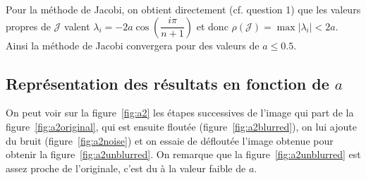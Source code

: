 Pour la méthode de Jacobi, on obtient directement (cf. question 1) que les valeurs propres de $\mathcal{J}$ valent
$\lambda _i = -2a \cos(\dfrac{i \pi}{n+1})$ et donc $\rho(\mathcal{J}) = \max |\lambda_i| < 2a$.
Ainsi la méthode de Jacobi convergera pour des valeurs de $a \leq 0.5$.

\subsection{Représentation des résultats en fonction de $a$}
On peut voir sur la figure~\ref{fig:a2} les étapes successives de l'image qui part
de la figure~\ref{fig:a2original}, qui est ensuite floutée (figure~\ref{fig:a2blurred}),
on lui ajoute du bruit (figure~\ref{fig:a2noise}) et on essaie de défloutée l'image obtenue pour
obtenir la figure~\ref{fig:a2unblurred}.
On remarque que la figure~\ref{fig:a2unblurred} est assez proche de l'originale, c'est du
à la valeur faible de $a$.

